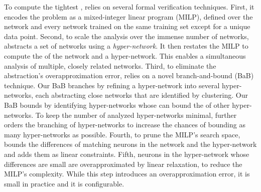 To compute the tightest \propa, \tool relies on several formal verification techniques. 
First, it encodes the problem as a
mixed-integer linear program (MILP), defined over the network and every network trained on the same training set except for a unique data point. %
Second, to scale the analysis over the immense number of networks, \tool abstracts a set of networks using a \emph{hyper-network}. 
It then restates the MILP to compute the \propa of the network and a hyper-network. %
This enables \tool a simultaneous analysis of multiple, closely related networks. 
Third, to eliminate the abstraction's overapproximation error, \tool 
relies on a novel branch-and-bound (BaB) technique. 
Our BaB branches by refining a hyper-network into several hyper-networks, each
abstracting close networks that are identified by clustering. Our BaB bounds by identifying hyper-networks whose \propa can bound the \propa of other hyper-networks. To keep the number of analyzed hyper-networks minimal, \tool further orders the branching of hyper-networks to increase the chances of bounding as many hyper-networks as possible.
Fourth, to prune the MILP's search space, \tool bounds the differences of matching neurons in the network and the hyper-network and adds them as linear constraints. %
Fifth, neurons in the hyper-network whose differences are small are overapproximated by linear relaxation,
to reduce the MILP's complexity. While this step introduces an overapproximation error, it is small in practice and it is configurable. %

